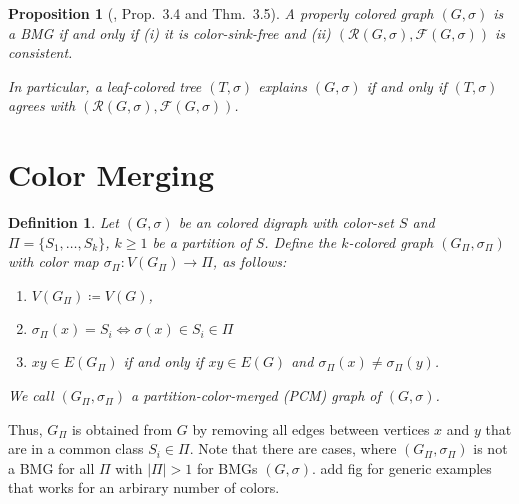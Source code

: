 \documentclass[final,3p,times]{elsarticle}
\newtheorem{proposition}[theorem]{Proposition}%
\newtheorem{definition}{Definition}[section]
\newcommand{\TODO}[1]{\begingroup\color{red}#1\endgroup}
\begin{document}
\begin{proposition}[\cite{Schaller:21b}, Prop.~3.4 and Thm.~3.5]
  \label{prop:BMG-triple-charac}
  A properly colored graph $(G,\sigma)$ is a BMG if and only if (i) it is
  color-sink-free and (ii) $(\mathscr{R}(G,\sigma),\mathscr{F}(G,\sigma))$
  is consistent. 
  
  In particular, a leaf-colored tree $(T , \sigma)$  explains $(G, \sigma )$ 
  if and only if $(T , \sigma)$ agrees with $(\mathscr{R}(G,\sigma),\mathscr{F}(G,\sigma))$. 
\end{proposition}

\section{Color Merging}
\label{sec:operators}


	
	

\begin{definition}
  Let $(G,\sigma)$ be an colored digraph with color-set $S$ and $\Pi =
  \{S_1,\dots,S_k\}$, $k\geq 1$ be a partition of $S$. Define the
  $k$-colored graph $(G_{\Pi},\sigma_{\Pi})$ with color map
  $\sigma_{\Pi}\colon V(G_{\Pi})\to \Pi$, as follows:
  \begin{enumerate}
  \item $V(G_{\Pi})\coloneqq V(G)$,
  \item $\sigma_{\Pi}(x)=S_i \iff \sigma(x)\in S_i\in\Pi$ 
  \item $xy\in E(G_{\Pi})$  if and only if $xy\in E(G)$ and 
    	  $\sigma_{\Pi}(x)\neq \sigma_{\Pi}(y)$. 
  \end{enumerate}
  We call $(G_{\Pi},\sigma_{\Pi})$ a \emph{partition-color-merged (PCM) graph of $(G,\sigma)$.}
\end{definition}	

Thus, $G_{\Pi}$ is obtained from $G$ by removing all edges between vertices $x$
and $y$ that are in a common class $S_i\in \Pi$. 
Note that there are cases, where  $(G_{\Pi},\sigma_{\Pi})$ is not a BMG 
for all $\Pi$ with $|\Pi|>1$ for  BMGs $(G,\sigma)$. \TODO{add fig for generic examples
that works for an arbirary number of colors. }
	
\end{document}
